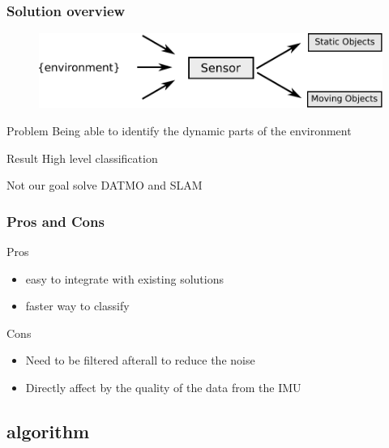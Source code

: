 \documentclass{beamer}
\begin{document}
	\begin{frame}
		\frametitle{Solution overview}
		\begin{figure}[h]
			\center
			\includegraphics[scale=0.5]{img/fig:problem}
		 \end{figure}
		 
		\begin{block}{Problem}
			 Being able to identify the dynamic parts of the environment
		\end{block}
		 
		\begin{block}{Result}
			High level classification
		\end{block}				 

		\begin{alertblock}{Not our goal}
			solve DATMO and SLAM
		\end{alertblock}
	\end{frame}

	\begin{frame}
		\frametitle{Pros and Cons}
		
		\begin{block}{Pros}
			\begin{itemize}
			\item easy to integrate with existing solutions
			\item faster way to classify
			\end{itemize}
		\end{block}		
		
		\begin{block}{Cons}
			\begin{itemize}
			\item Need to be filtered afterall to reduce the noise
			\item Directly affect by the quality of the data from the IMU
			\end{itemize}
		\end{block}
		
	\end{frame}

\subsection{algorithm}
\end{document}
